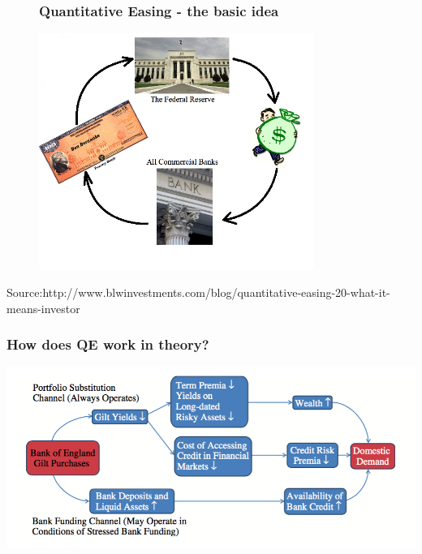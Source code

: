 \documentclass[11pt]{beamer}
\begin{document}
\begin{frame}
\begin{figure}
\frametitle{Quantitative Easing - the basic idea}
\includegraphics[width=0.8\textwidth]{QE123.png}
\end{figure}
\tiny{Source:http://www.blwinvestments.com/blog/quantitative-easing-20-what-it-means-investor}
\end{frame}
\begin{frame}
	\frametitle{How does QE work in theory?}
   	\includegraphics[width=\textwidth]{Figures/How_QE_works.png}
\end{frame}




\end{document}
